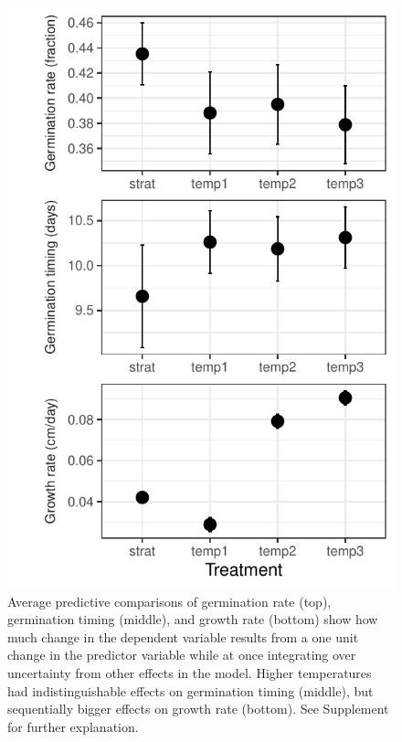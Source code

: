 \documentclass[12pt]{article}\usepackage[]{graphicx}\usepackage[]{color}
\begin{document}
\begin{figure}
	\begin{center}
	\includegraphics[scale=1]{apc_fig.pdf}
	\caption{Average predictive comparisons of germination rate (top), germination timing (middle), and growth rate (bottom) show how much change in the dependent variable results from a one unit change in the predictor variable while at once integrating over uncertainty from other effects in the model. Higher temperatures had indistinguishable effects on germination timing (middle), but sequentially bigger effects on growth rate (bottom). See Supplement for further explanation.}
\label{fig:apc}
\end{center}
\end{figure}
\end{document}
